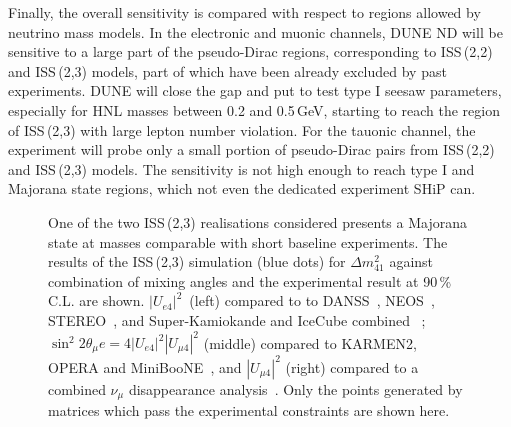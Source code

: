 Finally, the overall sensitivity is compared with respect to regions allowed by neutrino mass models.
In the electronic and muonic channels, DUNE ND will be sensitive to a large part of the pseudo-Dirac regions, %
corresponding to ISS\,(2,2) and ISS\,(2,3) models, %
part of which have been already excluded by past experiments.
DUNE will close the gap and put to test type I seesaw parameters, especially for HNL masses between 0.2 and 0.5\,GeV, %
starting to reach the region of ISS\,(2,3) with large lepton number violation.
For the tauonic channel, the experiment will probe only a small portion %
of pseudo-Dirac pairs from ISS\,(2,2) and ISS\,(2,3) models.
The sensitivity is not high enough to reach type I and Majorana state regions, which not even the dedicated experiment SHiP can.

\begin{figure}
	\centering
	{\resizebox{\linewidth}{!}{}}
	\caption[Comparison of ISS(2,3) with short baseline anomalies]%
		{One of the two ISS\,(2,3) realisations considered presents a Majorana state at masses comparable with short baseline experiments.
		The results of the ISS\,(2,3) simulation (blue dots) for $\Delta m_{4 1}^2$ against combination of mixing angles and %
		the experimental result at 90\,\% C.L. are shown.
		$|U_{e 4}|^2$~(left) compared to %
		to DANSS~\cite{Alekseev:2018efk}, NEOS~\cite{Ko:2016owz}, STEREO~\cite{AlmazanMolina:2019qul}, %
		and Super-Kamiokande and IceCube combined ~\cite{Dentler:2018sju};
		\mbox{$\sin^2 2\theta{_\mu e} = 4|U_{e 4}|^2|U_{\mu 4}|^2$} (middle) compared to KARMEN2, OPERA and MiniBooNE~\cite{Aguilar-Arevalo:2018gpe},
		and $|U_{\mu 4}|^2$ (right) compared to a combined $\nu_\mu$ disappearance analysis~\cite{Dentler:2018sju}.
		Only the points generated by matrices which pass the experimental constraints are shown here.}
	\label{fig:sblosc}
\end{figure}

